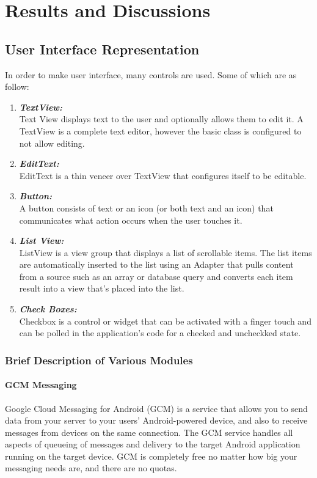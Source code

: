\chapter{Results and Discussions}
\section{User Interface Representation}
In order to make user interface, many controls are used. Some of which are as follow:
\begin{enumerate}
\item \textbf{\emph{TextView:}}\\
Text View displays text to the user and optionally allows them to edit it. A TextView is a complete text editor, however the basic class is configured to not allow editing.

\item \textbf{\emph{EditText:}}\\
EditText is a thin veneer over TextView that configures itself to be editable. 
\item \textbf{\emph{Button:}}\\
A button consists of text or an icon (or both text and an icon) that communicates what action occurs when the user touches it.

\item \textbf{\emph{List View:}}\\
ListView is a view group that displays a list of scrollable items. The list items are automatically inserted to the list using an Adapter that pulls content from a source such as an array or database query and converts each item result into a view that's placed into the list.

\item \textbf{\emph{Check Boxes:}}\\
Checkbox is a control or widget that can be activated with a finger touch and can be polled in the application's code for
a checked and uncheckked state.

\end{enumerate}
\subsection{Brief Description of Various Modules}
\subsubsection{GCM Messaging}
Google Cloud Messaging for Android (GCM) is a service that allows you to send data from your server to your users' Android-powered device, and also to receive messages from devices on the same connection. The GCM service handles all aspects of queueing of messages and delivery to the target Android application running on the target device. GCM is completely free no matter how big your messaging needs are, and there are no quotas.


